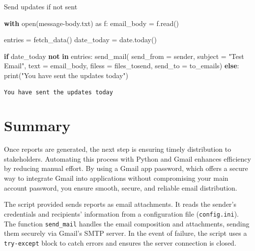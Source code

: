 \documentclass[
  letterpaper,
  DIV=11,
  numbers=noendperiod]{scrreprt}
\newenvironment{Shaded}{\begin{snugshade}}{\end{snugshade}}
\newcommand{\BuiltInTok}[1]{\textcolor[rgb]{0.00,0.23,0.31}{#1}}
\newcommand{\ControlFlowTok}[1]{\textcolor[rgb]{0.00,0.23,0.31}{\textbf{#1}}}
\newcommand{\ImportTok}[1]{\textcolor[rgb]{0.00,0.46,0.62}{#1}}
\newcommand{\KeywordTok}[1]{\textcolor[rgb]{0.00,0.23,0.31}{\textbf{#1}}}
\newcommand{\NormalTok}[1]{\textcolor[rgb]{0.00,0.23,0.31}{#1}}
\newcommand{\OperatorTok}[1]{\textcolor[rgb]{0.37,0.37,0.37}{#1}}
\newcommand{\StringTok}[1]{\textcolor[rgb]{0.13,0.47,0.30}{#1}}
\begin{document}
Send updates if not sent

\begin{Shaded}
\begin{Highlighting}[]
\ControlFlowTok{with} \BuiltInTok{open}\NormalTok{(}\StringTok{\textquotesingle{}message{-}body.txt\textquotesingle{}}\NormalTok{) }\ImportTok{as}\NormalTok{ f:}
\NormalTok{  email\_body }\OperatorTok{=}\NormalTok{ f.read()}
  
\NormalTok{entries }\OperatorTok{=}\NormalTok{ fetch\_data()}
\NormalTok{date\_today }\OperatorTok{=}\NormalTok{ date.today()}

\ControlFlowTok{if}\NormalTok{ date\_today }\KeywordTok{not} \KeywordTok{in}\NormalTok{ entries:}
\NormalTok{  send\_mail(}
\NormalTok{    send\_from }\OperatorTok{=}\NormalTok{ sender,}
\NormalTok{    subject }\OperatorTok{=} \StringTok{"Test Email"}\NormalTok{,}
\NormalTok{    text }\OperatorTok{=}\NormalTok{ email\_body,}
\NormalTok{    filess }\OperatorTok{=}\NormalTok{ files\_tosend,}
\NormalTok{    send\_to }\OperatorTok{=}\NormalTok{ to\_emails) }
\ControlFlowTok{else}\NormalTok{:}
  \BuiltInTok{print}\NormalTok{(}\StringTok{"You have sent the updates today"}\NormalTok{)}
\end{Highlighting}
\end{Shaded}

\begin{verbatim}
You have sent the updates today
\end{verbatim}

\section{Summary}\label{summary-3}

Once reports are generated, the next step is ensuring timely
distribution to stakeholders. Automating this process with Python and
Gmail enhances efficiency by reducing manual effort. By using a Gmail
app password, which offers a secure way to integrate Gmail into
applications without compromising your main account password, you ensure
smooth, secure, and reliable email distribution.

The script provided sends reports as email attachments. It reads the
sender's credentials and recipients' information from a configuration
file (\texttt{config.ini}). The function \texttt{send\_mail} handles the
email composition and attachments, sending them securely via Gmail's
SMTP server. In the event of failure, the script uses a
\texttt{try-except} block to catch errors and ensures the server
connection is closed.
\end{document}
